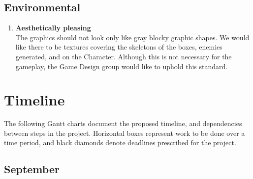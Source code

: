 \documentclass[10pt,letterpaper,oneside,english]{report}
\begin{document}
\subsection{Environmental}
\begin{enumerate}
\item \textbf{Aesthetically pleasing} \\ The graphics should not look only like gray blocky graphic shapes. We would like there to be textures covering the skeletons of the boxes, enemies generated, and on the Character. Although this is not necessary for the gameplay, the Game Design group would like to uphold this standard.
\end{enumerate}

\section{Timeline}
\label{Timeline}
The following Gantt charts document the proposed timeline, and dependencies between steps in the project. Horizontal boxes represent work to be done over a time period, and black diamonds denote deadlines prescribed for the project.

\subsection{September}
\begin{center}
\begin{ganttchart}[vgrid=true,hgrid=true]{21}
	\\
	\\
	\ganttnewline
	\ganttnewline
\end{ganttchart}
\end{center}
\end{document}
